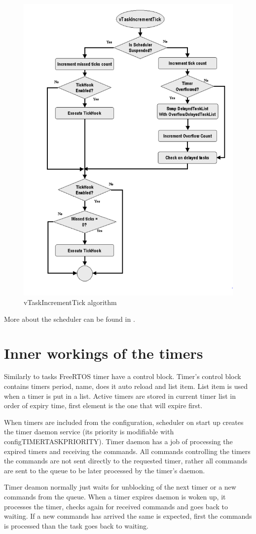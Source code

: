 \begin{figure}[H]

      \centering
      \includegraphics[width=0.8\linewidth]{images/freertos_scheduler_increment.png}
      \caption{vTaskIncrementTick algorithm\citep[p~23]{freertos_inner_workings}}
      \label{fig:freertos_scheduler_increment}
    
\end{figure}

More about the scheduler can be found in \citep{freertos_inner_workings}.

\section{Inner workings of the timers}

Similarly to tasks FreeRTOS timer have a control block. Timer's control block contains timers period, name, does it auto reload and list item. List item is used when a timer is put in a list.  Active timers are stored in current timer list in order of expiry time, first element is the one that will expire first.

When timers are included from the configuration, scheduler on start up  creates the timer daemon service (its priority is modifiable with configTIMER\textunderscore TASK\textunderscore PRIORITY). Timer daemon has a job of processing the expired timers and receiving the commands. All commands controlling the timers the commands are not sent directly to the requested timer, rather all commands are sent to the queue to be later processed by the timer's daemon.

Timer deamon normally just waits for unblocking of the next timer or a new commands from the queue. When a timer expires daemon is woken up, it processes the timer, checks again for received commands and goes back to waiting. If a new commands has arrived the same is expected, first the commands is processed than the task goes back to waiting.
